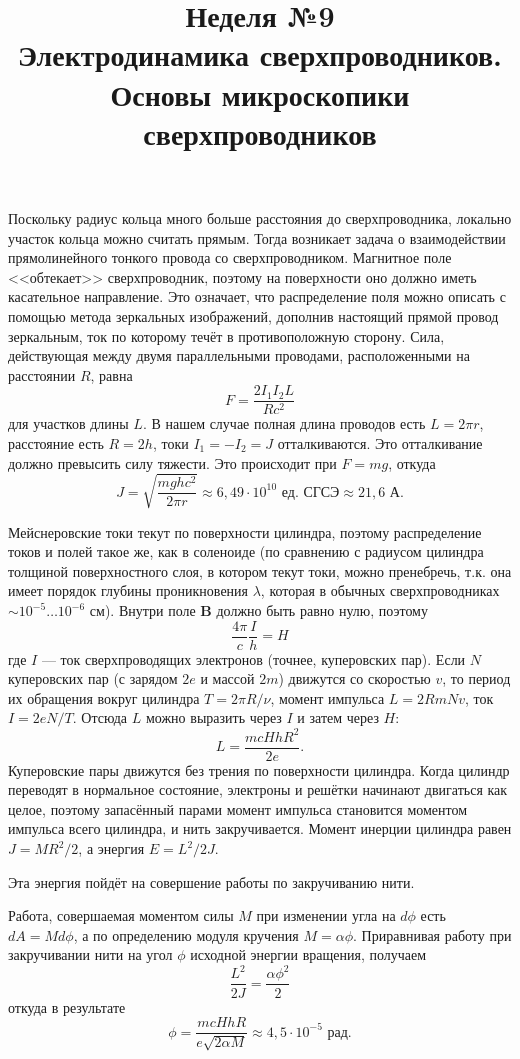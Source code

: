 \documentclass[a4paper]{article}
\title{Неделя №9\\
Электродинамика сверхпроводников. Основы микроскопики сверхпроводников}
\begin{document}
	\maketitle
\begin{hiProb}[5.4]
\end{hiProb}
\begin{sol}
Поскольку радиус кольца много больше расстояния до
сверхпроводника, локально участок кольца можно считать прямым.
Тогда возникает задача о взаимодействии прямолинейного тонкого
провода со сверхпроводником. Магнитное поле <<обтекает>>
сверхпроводник, поэтому на поверхности оно должно
иметь касательное направление. Это означает, что
распределение поля можно описать с помощью метода зеркальных
изображений, дополнив настоящий прямой провод зеркальным,
ток по которому течёт в противоположную сторону. Сила,
действующая между двумя параллельными проводами, расположенными
на расстоянии $R$, равна
\[
F= \frac{2 I_1 I_2 L}{Rc^2}
\] 
для участков длины $L$. В нашем случае полная длина
проводов есть $L=2\pi r$, расстояние есть $R=2h$, токи
$I_1=-I_2=J$ отталкиваются. Это отталкивание должно
превысить силу тяжести. Это происходит при $F=mg$, откуда
\[
J= \sqrt{\frac{mghc^2}{2\pi r}} \approx 6,49 \cdot 10^{10}
\text{ ед. СГСЭ}\approx 21,6 \text{ А}
.\] 
\end{sol}
\begin{hiProb}[5.7]
\end{hiProb}
\begin{sol}
Мейснеровские токи текут по поверхности цилиндра, поэтому
распределение токов и полей такое же, как в соленоиде
(по сравнению с радиусом цилиндра толщиной поверхностного
слоя, в котором текут токи, можно пренебречь, т.\:к.
она имеет порядок глубины проникновения $\lambda$,
которая в обычных сверхпроводниках $\sim 10^{-5}\ldots 10^{-6}$ 
см). Внутри поле $\mathbf{B}$ должно быть равно нулю, поэтому
\[
\frac{4\pi}{c} \frac{I}{h}=H
\] 
где $I$ --- ток сверхпроводящих электронов (точнее, куперовских
пар). Если $N$ куперовских пар (с зарядом $2e$ и массой
$2m$) движутся со скоростью $v$, то период их обращения
вокруг цилиндра $T= 2\pi R /\nu$, момент импульса $L=2RmNv$,
ток $I=2e N/T$. Отсюда $L$ можно выразить через $I$ и 
затем через  $H$:
\[
L= \frac{mcHhR^2 }{2e}
.\] 
Куперовские пары движутся без трения по поверхности цилиндра.
Когда цилиндр переводят в нормальное состояние, электроны
и решётки начинают двигаться как целое, поэтому
запасённый парами момент импульса становится моментом
импульса всего цилиндра, и нить закручивается. Момент инерции
цилиндра равен $J=M R^2 /2$, а энергия $E=L^2 /2J$.

Эта энергия пойдёт на совершение работы по закручиванию
нити.

Работа, совершаемая моментом силы $M$ при изменении
угла на $d\phi$ есть $dA= Md\phi$, а по определению
модуля кручения $M=\alpha\phi$. Приравнивая работу при
закручивании нити на угол $\phi$ исходной энергии вращения,
получаем
\[
\frac{L^2}{2J}= \frac{\alpha \phi^2}{2}
\]
откуда в результате
\[
\phi= \frac{mcHhR}{e\sqrt{2\alpha M} }\approx
4,5 \cdot 10^{-5}\text{ рад}
.\] 
\end{sol}
\end{document}
